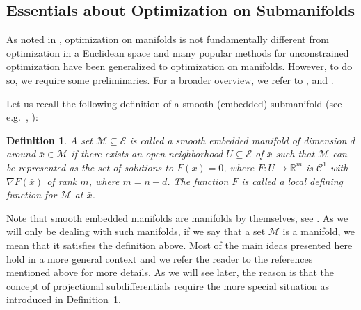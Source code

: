 \documentclass[a4paper, 12pt]{article}
\numberwithin{equation}{section}
\theoremstyle{bolddef}
\newtheorem{definition}{Definition}[section]
\theoremstyle{definition}
\theoremstyle{boldplain}
\newcommand{\R}{\mathbb{R}}
\begin{document}
\subsection{Essentials about Optimization on Submanifolds}

As noted in \cite{Boumal2018}, optimization on manifolds is not fundamentally different from optimization in a Euclidean space and many popular methods for unconstrained optimization have been generalized to optimization on manifolds. However, to do so, we require some preliminaries. For a broader overview, we refer to \cite{Absil2008}, \cite{Hu2020} and \cite{Boumal2023}.

Let us recall the following definition of a smooth (embedded) submanifold (see e.g.\ \cite[Example 6.8]{RockafellarWets2009}, \cite[Definition 3.10]{Boumal2023}):
\begin{definition}\label{def:manifold}
	A set $\mathcal{M} \subseteq \mathcal{E}$ is called a \emph{smooth embedded manifold} of dimension $d$ around $\bar x \in \mathcal{M}$ if there exists an open neighborhood $U \subseteq \mathcal{E}$ of $\bar x$ such that $\mathcal{M}$ can be represented as the set of solutions to $F(x) = 0$, where $F: U \to \R^m$ is $\mathcal{C}^1$ with $\nabla F(\bar x)$ of rank $m$, where $m = n-d$. The function $F$ is called a \emph{local defining function} for $\mathcal{M}$ at $\bar x$.
\end{definition}
Note that smooth embedded manifolds are manifolds by themselves, see \cite{Boumal2023}. As we will only be dealing with such manifolds, if we say that a set $\mathcal{M}$ is a manifold, we mean that it satisfies the definition above. Most of the main ideas presented here hold in a more general context and we refer the reader to the references mentioned above for more details. As we will see later, the reason is that the concept of projectional subdifferentials require the more special situation as introduced in Definition~\ref{def:manifold}.
\end{document}
